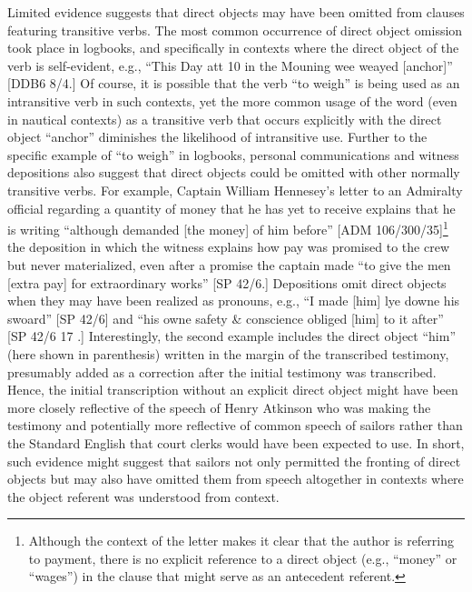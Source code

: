   Limited evidence suggests that direct objects may have been omitted from clauses featuring transitive verbs. The most common occurrence of direct object omission took place in logbooks, and specifically in contexts where the direct object of the verb is self-evident, e.g., “This Day att 10 in the Mouning wee weayed [anchor]” [DDB6 8/4.] Of course, it is possible that the verb “to weigh” is being used as an intransitive verb in such contexts, yet the more common usage of the word (even in nautical contexts) as a transitive verb that occurs explicitly with the direct object “anchor” diminishes the likelihood of intransitive use. Further to the specific example of “to weigh” in logbooks, personal communications and witness depositions also suggest that direct objects could be omitted with other normally transitive verbs. For example, Captain William Hennesey’s letter to an Admiralty official regarding a quantity of money that he has yet to receive explains that he is writing “although demanded [the money] of him before” [ADM 106/300/35]\footnote{Although the context of the letter makes it clear that the author is referring to payment, there is no explicit reference to a direct object (e.g., “money” or “wages”) in the clause that might serve as an antecedent referent.}  the deposition in which the witness explains how pay was promised to the crew but never materialized, even after a promise the captain made “to give the men [extra pay] for extraordinary works” [SP 42/6.] Depositions omit direct objects when they may have been realized as pronouns, e.g., “I made [him] lye downe his swoard” [SP 42/6] and “his owne safety \& conscience obliged [him] to it after” [SP 42/6 17 \citealt{Aug1700}.] Interestingly, the second example includes the direct object “him” (here shown in parenthesis) written in the margin of the transcribed testimony, presumably added as a correction after the initial testimony was transcribed. Hence, the initial transcription without an explicit direct object might have been more closely reflective of the speech of Henry Atkinson who was making the testimony and potentially more reflective of common speech of sailors rather than the Standard English that court clerks would have been expected to use. In short, such evidence might suggest that sailors not only permitted the fronting of direct objects but may also have omitted them from speech altogether in contexts where the object referent was understood from context.  

